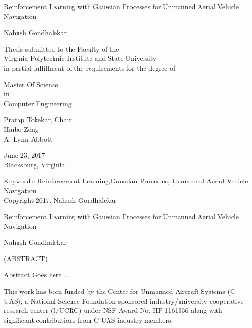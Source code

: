 \documentclass[12pt]{report}
\begin{document}
\thispagestyle{empty}
\begin{center}

{\Large 
Reinforcement Learning with Gaussian Processes for Unmanned Aerial Vehicle Navigation
}

\vfill

Nahush Gondhalekar

\vfill

Thesis submitted to the Faculty of the \\
Virginia Polytechnic Institute and State University \\
in partial fulfillment of the requirements for the degree of

\vfill

Master Of Science \\
in \\
Computer Engineering

\vfill

Pratap Tokekar, Chair \\
Haibo Zeng \\
A. Lynn Abbott

\vfill

June 23, 2017 \\
Blacksburg, Virginia

\vfill

Keywords: Reinforcement Learning,Gaussian Processes, Unmanned Aerial Vehicle Navigation
\\
Copyright 2017, Nahush Gondhalekar

\end{center}

\pagebreak

\thispagestyle{empty}
\begin{center}

{\large Reinforcement Learning with Gaussian Processes for Unmanned Aerial Vehicle Navigation}

\vfill

Nahush Gondhalekar

\vfill

(ABSTRACT)

\vfill

\end{center}

Abstract Goes here ..

\vfill


This work has been funded by the Center for Unmanned Aircraft Systems (C-UAS), a National Science Foundation-sponsored industry/university cooperative research center (I/UCRC) under NSF Award No. IIP-1161036 along with significant contributions from C-UAS industry members.
\end{document}
